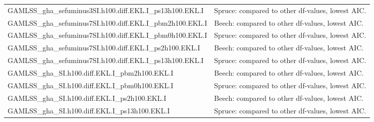 \begin{landscape}
\begin{singlespace}
{\begin{longtabu}{l L}
        GAMLSS\_gha\_sefuminus3SI.h100.diff.EKL.I\_ps13h100.EKL.I & Spruce: compared to other df-values, lowest AIC. \\
        GAMLSS\_gha\_sefuminus7SI.h100.diff.EKL.I\_pbm2h100.EKL.I & Beech: compared to other df-values, lowest AIC. \\
        GAMLSS\_gha\_sefuminus7SI.h100.diff.EKL.I\_pbm0h100.EKL.I & Spruce: compared to other df-values, lowest AIC. \\
        GAMLSS\_gha\_sefuminus7SI.h100.diff.EKL.I\_ps2h100.EKL.I & Beech: compared to other df-values, lowest AIC. \\
        GAMLSS\_gha\_sefuminus7SI.h100.diff.EKL.I\_ps13h100.EKL.I & Spruce: compared to other df-values, lowest AIC. \\
        GAMLSS\_gha\_SI.h100.diff.EKL.I\_pbm2h100.EKL.I & Beech: compared to other df-values, lowest AIC. \\
        GAMLSS\_gha\_SI.h100.diff.EKL.I\_pbm0h100.EKL.I & Spruce: compared to other df-values, lowest AIC. \\
        GAMLSS\_gha\_SI.h100.diff.EKL.I\_ps2h100.EKL.I & Beech: compared to other df-values, lowest AIC. \\
        GAMLSS\_gha\_SI.h100.diff.EKL.I\_ps13h100.EKL.I & Spruce: compared to other df-values, lowest AIC. \\
      \end{longtabu}
    }
  \end{singlespace}

\end{landscape}

